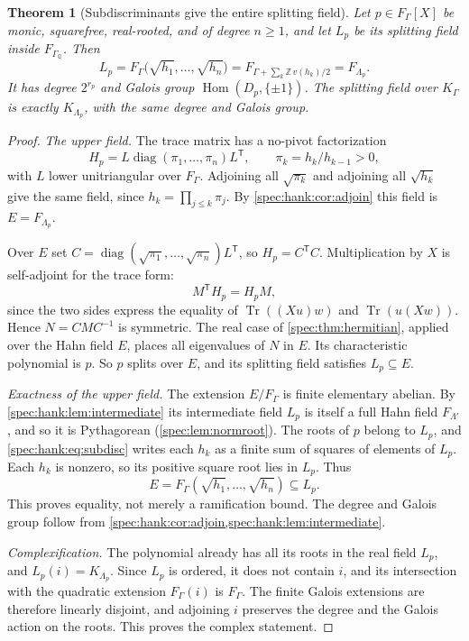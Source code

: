 \documentclass[11pt,a4paper]{article}
\numberwithin{equation}{section}
\newtheorem{theorem}{Theorem}[section]
\theoremstyle{definition}
\theoremstyle{remark}
\newcommand{\Q}{\mathbb Q}
\newcommand{\Z}{\mathbb Z}
\newcommand{\diag}{\operatorname{diag}}
\newcommand{\Hom}{\operatorname{Hom}}
\newcommand{\Tr}{\operatorname{Tr}}
\begin{document}
\begin{theorem}[Subdiscriminants give the entire splitting field]
\label{spec:hank:thm:field}
Let $p\in F_\Gamma[X]$ be monic, squarefree, real-rooted, and of degree
$n\ge1$, and let $L_p$ be its splitting field inside $F_{\Gamma_\Q}$. Then
\begin{equation}\label{spec:hank:eq:exactfield}
 L_p=F_\Gamma\bigl(\sqrt{h_1},\ldots,\sqrt{h_n}\bigr)
    =F_{\Gamma+\sum_k\Z\,v(h_k)/2}=F_{\Lambda_p}.
\end{equation}
It has degree $2^{r_p}$ and Galois group $\Hom(D_p,\{\pm1\})$. The splitting
field over $K_\Gamma$ is exactly $K_{\Lambda_p}$, with the same degree and
Galois group.
\end{theorem}
\begin{proof}
\emph{The upper field.} The trace matrix has a no-pivot factorization
\[
 H_p=L\diag(\pi_1,\ldots,\pi_n)L^{\mathsf T},
 \qquad \pi_k=h_k/h_{k-1}>0,
\]
with $L$ lower unitriangular over $F_\Gamma$. Adjoining all $\sqrt{\pi_k}$
and adjoining all $\sqrt{h_k}$ give the same field, since
$h_k=\prod_{j\le k}\pi_j$. By \cref{spec:hank:cor:adjoin} this field is
$E=F_{\Lambda_p}$.

Over $E$ set $C=\diag(\sqrt{\pi_1},\ldots,\sqrt{\pi_n})L^{\mathsf T}$, so
$H_p=C^{\mathsf T}C$. Multiplication by $X$ is self-adjoint for the trace form:
\[
 M^{\mathsf T}H_p=H_pM,
\]
since the two sides express the equality of $\Tr((Xu)w)$ and $\Tr(u(Xw))$.
Hence $N=CMC^{-1}$ is symmetric. The real case of \cref{spec:thm:hermitian},
applied over the Hahn field $E$, places all eigenvalues of $N$ in $E$. Its
characteristic polynomial is $p$. So $p$ splits over $E$, and its splitting
field satisfies $L_p\subseteq E$.

\emph{Exactness of the upper field.} The extension $E/F_\Gamma$ is finite
elementary abelian. By \cref{spec:hank:lem:intermediate} its intermediate
field $L_p$ is itself a full Hahn field $F_{\Lambda'}$, and so it is
Pythagorean (\cref{spec:lem:normroot}). The roots of $p$ belong to $L_p$, and
\eqref{spec:hank:eq:subdisc} writes each $h_k$ as a finite sum of squares of
elements of $L_p$. Each $h_k$ is nonzero, so its positive square root lies in
$L_p$. Thus
\[
 E=F_\Gamma(\sqrt{h_1},\ldots,\sqrt{h_n})\subseteq L_p.
\]
This proves equality, not merely a ramification bound. The degree and Galois
group follow from \cref{spec:hank:cor:adjoin,spec:hank:lem:intermediate}.

\emph{Complexification.} The polynomial already has all its roots in the
real field $L_p$, and $L_p(i)=K_{\Lambda_p}$. Since $L_p$ is ordered, it
does not contain $i$, and its intersection with the quadratic extension
$F_\Gamma(i)$ is $F_\Gamma$. The finite Galois extensions are therefore
linearly disjoint, and adjoining $i$ preserves the degree and the Galois
action on the roots. This proves the complex statement.
\end{proof}
\end{document}
